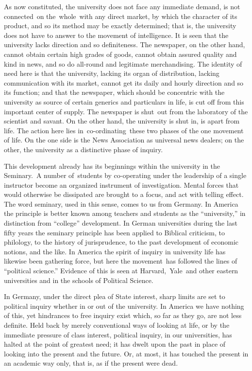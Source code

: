 \documentclass[openany,nobib]{tufte-book}
\begin{document}
As now constituted, the university does not face any immediate demand,
is not connected~on the~whole~with any direct market, by which the
character of its product, and so its method may be exactly determined;
that is, the university does not have to answer to the movement of
intelligence. It is seen that the university lacks direction and so
definiteness. The newspaper, on the other hand, cannot obtain certain
high grades of goods, cannot obtain assured quality and kind in news,
and so do all-round and legitimate merchandising. The identity of need
here is that the university, lacking its organ of distribution, lacking
communication with its market, cannot get its daily and hourly direction
and so its function; and that the newspaper, which should be concentric
with the university as source of certain generics and particulars in
life, is cut off from this important center of supply. The newspaper is
shut~out from the laboratory of the scientist and savant. On the other
hand, the university is shut in, is apart from life. The action here
lies in~co-ordinating~these two phases of the one movement of life. On
the one side is the News Association as universal news dealers; on the
other, the university as a distinctive phase of inquiry.~

This development already has its beginnings within the university in the
Seminary.~A number of~students by co-operating under the leadership of a
single instructor become an organized instrument of investigation.
Mental forces that would otherwise be dissipated are brought to a focus,
and act with telling effect. The word seminary, used in this sense,
comes to us from Germany. In America the principle is better known among
teachers and students as the ``university,'' in distinction from
``college'' development. In German universities during the last fifty
years the seminary principle has been applied to Biblical criticism, to
philology, to the history of jurisprudence, to the past development of
economic notions, and the like. In America the spirit of inquiry in
university life has likewise been gathering force, but here the
movement~has followed the lines of ``political science.'' Evidence of
this is seen at Harvard,~Yale~and other eastern universities and in the
schools of Political Science.~

In Germany, under the direct plea of State interest, sharp limits are
set to political inquiry whether in or out of the university. In America
we have nothing of this, yet hindrances to free inquiry exist which, so
far as they go, are not less definite. Held back by merely conventional
ways of looking at life, or by the immediate pressure of class interest,
political inquiry, in our universities, has halted at the point of
greatest need; it has dwelt upon the past in place of looking into the
present and the future. Or, at most, it has touched the present in an
academic way only, that is, as if the present were dead.~
\end{document}
